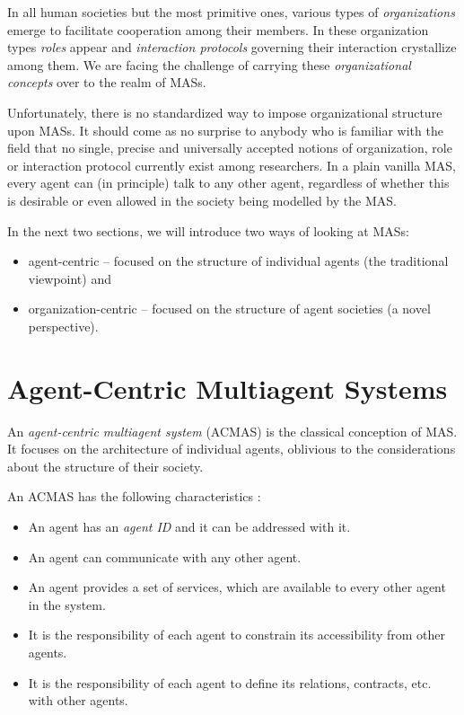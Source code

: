 In all human societies but the most primitive ones, various types of \textit{organizations} emerge to facilitate cooperation among their members.
In these organization types \textit{roles} appear and \textit{interaction protocols} governing their interaction crystallize among them.
We are facing the challenge of carrying these \textit{organizational concepts} over to the realm of MASs.

Unfortunately, there is no standardized way to impose organizational structure upon MASs.
It should come as no surprise to anybody who is familiar with the field that no single, precise and universally accepted notions of organization, role or interaction protocol currently exist among researchers.
In a plain vanilla MAS, every agent can (in principle) talk to any other agent, regardless of whether this is desirable or even allowed in the society being modelled by the MAS.

In the next two sections, we will introduce two ways of looking at MASs:
\begin{itemize}
	\item agent-centric -- focused on the structure of individual agents (the traditional viewpoint) and
	\item organization-centric -- focused on the structure of agent societies (a novel perspective).
\end{itemize}

\section{Agent-Centric Multiagent Systems}

An \textit{agent-centric multiagent system} (ACMAS) is the classical conception of MAS.
It focuses on the architecture of individual agents, oblivious to the considerations about the structure of their society.

An ACMAS has the following characteristics \cite{Ferber03}:
\begin{itemize}
	\item An agent has an \textit{agent ID} and it can be addressed with it.
	\item An agent can communicate with any other agent.
	\item An agent provides a set of services, which are available to every other agent in the system.
	\item It is the responsibility of each agent to constrain its accessibility from other agents.
	\item It is the responsibility of each agent to define its relations, contracts, etc. with other agents.
\end{itemize}

